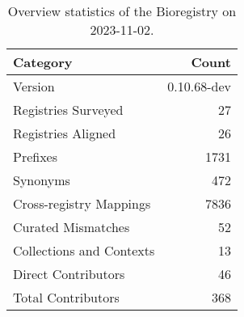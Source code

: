 \begin{table}
\caption{Overview statistics of the Bioregistry on 2023-11-02.}
\label{tab:bioregistry-summary}
\begin{tabular}{lr}
\toprule
Category & Count \\
\midrule
Version & 0.10.68-dev \\
Registries Surveyed & 27 \\
Registries Aligned & 26 \\
Prefixes & 1731 \\
Synonyms & 472 \\
Cross-registry Mappings & 7836 \\
Curated Mismatches & 52 \\
Collections and Contexts & 13 \\
Direct Contributors & 46 \\
Total Contributors & 368 \\
\bottomrule
\end{tabular}
\end{table}
